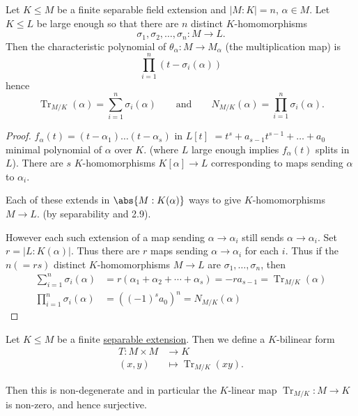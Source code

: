 \documentclass{article}
\DeclareMathOperator{\Tr}{Tr}
\begin{document}
\begin{nthm}\label{thm:2.20}
    Let $K \leq M$ be a finite separable field extension and $|M:K| = n$, $\alpha \in M$.
    Let $K \leq L$ be large enough so that there are $n$ distinct $K$-homomorphisms
    \begin{equation*}
        \sigma_1, \sigma_2, \dotsc, \sigma_n: M \longrightarrow L.
    \end{equation*}
    Then the characteristic polynomial of $\theta_\alpha:M \to M_\alpha$ (the multiplication map) is
    \begin{equation*}
        \prod_{i=1}^n (t-\sigma_i(\alpha))
    \end{equation*}
    hence
    \begin{equation*}
        \Tr_{M/K} (\alpha) = \sum_{i=1}^n \sigma_i(\alpha) \qquad \text{and} \qquad N_{M/K}(\alpha) = \prod_{i=1}^n \sigma_i(\alpha).
    \end{equation*}
\end{nthm}

\begin{proof}
    $f_\alpha(t) = (t-\alpha_1) \dotsc (t-\alpha_s)$ in $L[t]$
    $ = t^s + a_{s-1} t^{s-1} + \dotsc + a_0$
    minimal polynomial of $\alpha$ over $K$.
    (where $L$ large enough implies $f_\alpha(t)$ splits in $L$).
    There are $s$ $K$-homomorphisms $K[\alpha] \to L$ corresponding to maps sending $\alpha$ to $\alpha_i$.

    Each of these extends in $\abs{M:K(\alpha)}$ ways to give $K$-homomorphisms $M \to L$. (by separability and 2.9).


    However each such extension of a map sending $\alpha \to \alpha_i$ still sends $\alpha \to \alpha_i$.
    Set $r = |L:K(\alpha)|$. Thus there are $r$ maps sending $\alpha \to \alpha_i$ for each $i$.
    Thus if the $n (=rs)$ distinct $K$-homomorphisms $M \to L$ are $\sigma_1, \dotsc, \sigma_n$, then
    \begin{align*}
        \sum_{i=1}^n \sigma_i(\alpha) &= r(\alpha_1 + \alpha_2 + \dotsb + \alpha_s) = -r a_{s-1} = \Tr_{M/K}(\alpha) \\
        \prod_{i=1}^n \sigma_i(\alpha) &= ((-1)^s a_0)^n = N_{M/K}(\alpha)
    \end{align*}
\end{proof}


\begin{nthm}\label{thm:2.21}
    Let $K \leq M$ be a finite \hyperlink{def:separableExt}{separable extension}.
    Then we define a $K$-bilinear form
    \begin{align*}
        T: M \times M &\rightarrow K \\
        (x, y) &\longmapsto \Tr_{M/K} (xy).
    \end{align*}

    Then this is non-degenerate and in particular the $K$-linear map $\Tr_{M/K}:M \to K$ is non-zero, and hence surjective.
\end{nthm}
\end{document}
